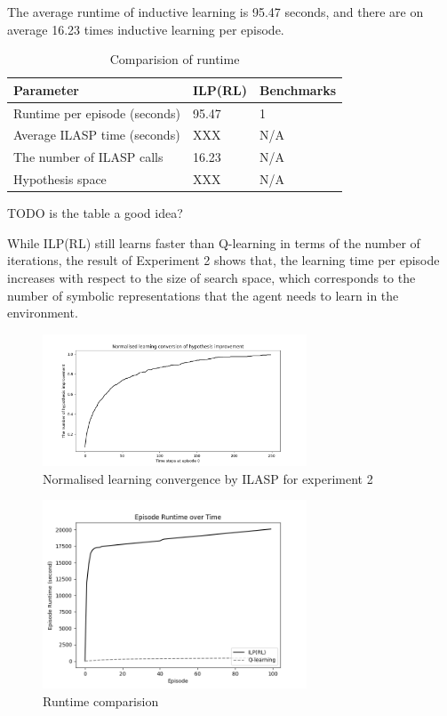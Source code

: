 The average runtime of inductive learning is 95.47 seconds, and there are on average 16.23 times inductive learning per episode.

\begin{table}[!ht!b]
\centering
\begin{tabular}{lll}
\hline
Parameter            & ILP(RL)    & Benchmarks      \\ \hline
Runtime per episode (seconds) & 95.47        & 1        \\
Average ILASP time (seconds)& XXX        & N/A        \\
The number of ILASP calls &  16.23      & N/A       \\
Hypothesis space &  XXX      & N/A       \\
\end{tabular}
\caption{Comparision of runtime}
\label{param}
\end{table}
TODO is the table a good idea?

While ILP(RL) still learns faster than Q-learning in terms of the number of iterations, 
the result of Experiment 2 shows that, the learning time per episode increases with respect to the size of search space, 
which corresponds to the number of symbolic representations that the agent needs to learn in the environment.

\begin{figure}[!htb]
\centering
\includegraphics[width=0.7\textwidth]{./figures/experiment2_ilasp}
\caption{Normalised learning convergence by ILASP for experiment 2}
\label{experiment2_ilasp}
\end{figure}

\begin{figure}[!htb]
\centering
\includegraphics[width=0.7\textwidth]{./figures/experiment2_runtime}
\caption{Runtime comparision}
\label{experiment2_runtime}
\end{figure}

